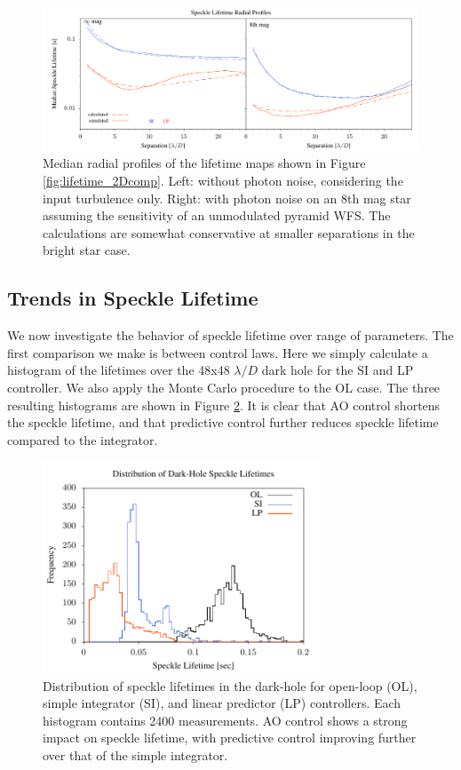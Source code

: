 \documentclass[11pt,preprint]{aastex}
\begin{document}
\begin{figure}
\hspace{-0.3in}
\includegraphics[width=6.5in]{lifetimesRP.pdf}
\caption{Median radial profiles of the lifetime maps shown in Figure \ref{fig:lifetime_2Dcomp}.  Left: without photon noise, considering the input turbulence only.  Right: with photon noise on an 8th mag star assuming the sensitivity of an unmodulated pyramid WFS. The calculations are somewhat conservative at smaller separations in the bright star case.  \label{fig:lifetime_radprof}}
\end{figure}

\clearpage

\subsection{Trends in Speckle Lifetime}
\label{sec:trends}

We now investigate the behavior of speckle lifetime over range of parameters.  The first comparison we make is between control laws.  Here we simply calculate a histogram of the lifetimes over the 48x48 $\lambda/D$ dark hole for the SI and LP controller.  We also apply the Monte Carlo procedure to the OL case.  The three resulting histograms are shown in Figure \ref{fig:slHist}.  It is clear that AO control shortens the speckle lifetime, and that predictive control further reduces speckle lifetime compared to the integrator.

\begin{figure}[h]
\centering
\includegraphics[width=3.25in]{slHist.pdf}
\caption{Distribution of speckle lifetimes in the dark-hole for open-loop (OL), simple integrator (SI), and linear predictor (LP) controllers. Each histogram contains 2400 measurements.  AO control shows a strong impact on speckle lifetime, with predictive control improving further over that of the simple integrator. 
\label{fig:slHist}
}
\end{figure}
\end{document}
